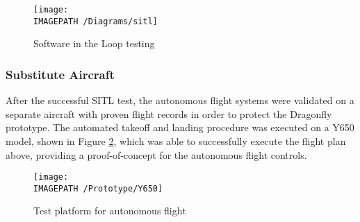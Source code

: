 \begin{figure}[H]
	\centering
	\texttt{[image: \\IMAGEPATH /Diagrams/sitl]}
	\caption{Software in the Loop testing}
	\label{fig:sitl}
\end{figure}

\subsubsection*{Substitute Aircraft}
After the successful SITL test, the autonomous flight systems were validated on a separate aircraft with proven flight records in order to protect the Dragonfly prototype. The automated takeoff and landing procedure was executed on a Y650 model, shown in Figure \ref{fig:Y650}, which was able to successfully execute the flight plan above, providing a proof-of-concept for the autonomous flight controls.

\begin{figure}[H]
	\centering
	\texttt{[image: \\IMAGEPATH /Prototype/Y650]}
 	\caption{Test platform for autonomous flight}
 	\label{fig:Y650}
\end{figure}